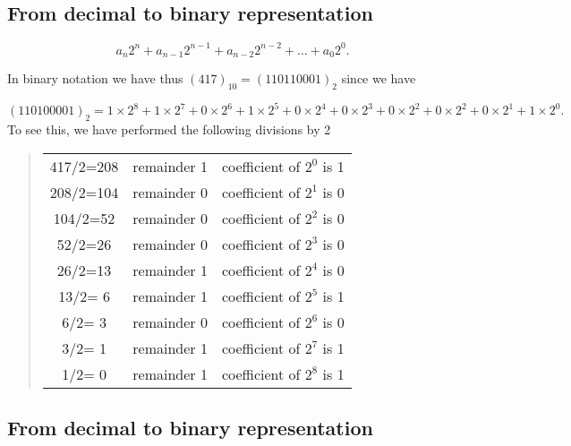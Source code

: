 \documentclass[%
twoside,                 %
final,                   %
10pt]{article}
\newenvironment{block_mdfboxadmon}[1][]{
\begin{block_mdfboxmdframed}[frametitle=#1]
}
{
\end{block_mdfboxmdframed}
}
\begin{document}
\subsection{From decimal to binary representation}


\begin{block_mdfboxadmon}[How to do it.]
\[
  a_n2^n+a_{n-1}2^{n-1}  +a_{n-2}2^{n-2}  +\dots +a_{0}2^{0}.
\]

In binary notation we have thus $(417)_{10} =(110110001)_2$
since we have

\[
(110100001)_2
=1\times2^8+1\times 2^{7}+0\times 2^{6}+1\times 2^{5}+0\times 2^{4}+0\times 2^{3}+0\times 2^{2}+0\times 2^{2}+0\times 2^{1}+1\times 2^{0}.
\]
To see this, we have performed the following divisions by 2




\begin{quote}
\begin{tabular}{ccc}
\hline
 \\
\hline
417/2=208                   & remainder 1                 & coefficient of $2^{0}$ is 1 \\
208/2=104                   & remainder 0                 & coefficient of $2^{1}$ is 0 \\
104/2=52                    & remainder 0                 & coefficient of $2^{2}$ is 0 \\
52/2=26                     & remainder 0                 & coefficient of $2^{3}$ is 0 \\
26/2=13                     & remainder 1                 & coefficient of $2^{4}$ is 0 \\
13/2= 6                     & remainder 1                 & coefficient of $2^{5}$ is 1 \\
6/2= 3                      & remainder 0                 & coefficient of $2^{6}$ is 0 \\
3/2= 1                      & remainder 1                 & coefficient of $2^{7}$ is 1 \\
1/2= 0                      & remainder 1                 & coefficient of $2^{8}$ is 1 \\
\hline
\end{tabular}
\end{quote}

\noindent
\end{block_mdfboxadmon}



\subsection{From decimal to binary representation}
\end{document}
